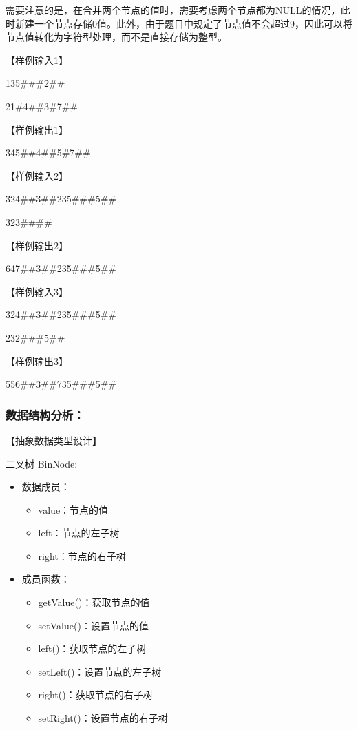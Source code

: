 \documentclass[
]{article}
\begin{document}
需要注意的是，在合并两个节点的值时，需要考虑两个节点都为NULL的情况，此时新建一个节点存储0值。此外，由于题目中规定了节点值不会超过9，因此可以将节点值转化为字符型处理，而不是直接存储为整型。

【样例输入1】

135\#\#\#2\#\#

21\#4\#\#3\#7\#\#

【样例输出1】

345\#\#4\#\#5\#7\#\#

【样例输入2】

324\#\#3\#\#235\#\#\#5\#\#

323\#\#\#\#

【样例输出2】

647\#\#3\#\#235\#\#\#5\#\#

【样例输入3】

324\#\#3\#\#235\#\#\#5\#\#

232\#\#\#5\#\#

【样例输出3】

556\#\#3\#\#735\#\#\#5\#\#

\hypertarget{ux6570ux636eux7ed3ux6784ux5206ux6790}{%
\subsubsection{数据结构分析：}\label{ux6570ux636eux7ed3ux6784ux5206ux6790}}

【抽象数据类型设计】

二叉树 BinNode:

\begin{itemize}
\item
  数据成员：

  \begin{itemize}
  \item
    value：节点的值
  \item
    left：节点的左子树
  \item
    right：节点的右子树
  \end{itemize}
\item
  成员函数：

  \begin{itemize}
  \item
    getValue()：获取节点的值
  \item
    setValue()：设置节点的值
  \item
    left()：获取节点的左子树
  \item
    setLeft()：设置节点的左子树
  \item
    right()：获取节点的右子树
  \item
    setRight()：设置节点的右子树
  \end{itemize}
\end{itemize}
\end{document}
